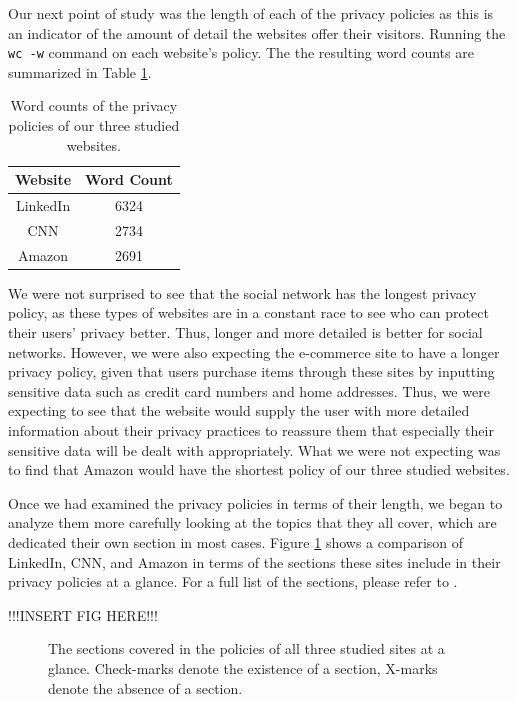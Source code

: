 \documentclass{acm_proc_article-sp}
\begin{document}
Our next point of study was the length of each of the privacy policies as this is an indicator of the amount of detail the websites offer their visitors. Running the \texttt{wc -w} command on each website's policy. The the resulting word counts are summarized in Table \ref{tab:wc}.

\begin{table}[htbp]
  \centering
  \caption{Word counts of the privacy policies of our three studied websites.}
    \begin{tabular}{|c|c|}
    \hline
    \textbf{Website} & \textbf{Word Count} \\    
     \hline
     LinkedIn & 6324 \\
     CNN & 2734 \\
     Amazon & 2691 \\
     \hline
    \end{tabular}%
  \label{tab:wc}%
\end{table}%

We were not surprised to see that the social network has the longest privacy policy, as these types of websites are in a constant race to see who can protect their users' privacy better. Thus, longer and more detailed is better for social networks. However, we were also expecting the e-commerce site to have a longer privacy policy, given that users purchase items through these sites by inputting sensitive data such as credit card numbers and home addresses. Thus, we were expecting to see that the website would supply the user with more detailed information about their privacy practices to reassure them that especially their sensitive data will be dealt with appropriately. What we were not expecting was to find that Amazon would have the shortest policy of our three studied websites.

Once we had examined the privacy policies in terms of their length, we began to analyze them more carefully looking at the topics that they all cover, which are dedicated their own section in most cases. Figure \ref{fig:at-a-glance} shows a comparison of LinkedIn, CNN, and Amazon in terms of the sections these sites include in their privacy policies at a glance. For a full list of the sections, please refer to \cite{amazon,linkedin,cnn}.

!!!INSERT FIG HERE!!!
\begin{figure} 
\centering
\caption{The sections covered in the policies of all three studied sites at a glance. Check-marks denote the existence of a section, X-marks denote the absence of a section.}
\label{fig:at-a-glance}
\end{figure}
\end{document}

